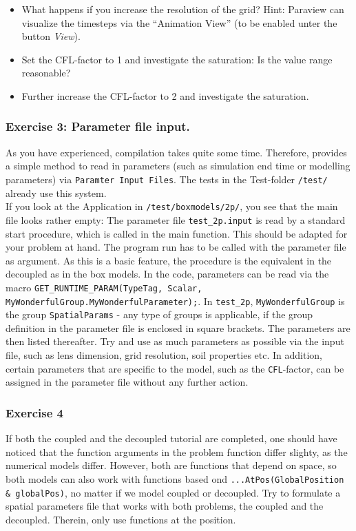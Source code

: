 \begin{itemize}
 \item What happens if you increase the resolution of the grid? Hint: Paraview can visualize the timesteps via the ``Animation View'' (to be enabled unter the button \textit{View}).
 \item Set the CFL-factor to 1 and investigate the saturation: Is the value range reasonable?
 \item Further increase the CFL-factor to 2 and investigate the saturation.
\end{itemize}

\subsubsection{Exercise 3: Parameter file input.}
As you have experienced, compilation takes quite some time. Therefore,  provides a simple method to read in parameters (such as simulation end time or modelling parameters) via \texttt{Paramter Input Files}. The tests in the Test-folder \texttt{/test/} already use this system.\\
If you look at the Application in \texttt{/test/boxmodels/2p/}, you see that the main file looks rather empty: The parameter file \texttt{test\_2p.input} is read by a standard start procedure, which is called in the main function. This should be adapted for your problem at hand. The program run has to be called with the parameter file as argument. As this is a basic \Dumux feature, the procedure is the equivalent in the decoupled as in the box models.
In the code, parameters can be read via the macro \texttt{GET\_RUNTIME\_PARAM(TypeTag, Scalar, MyWonderfulGroup.MyWonderfulParameter);}. In \texttt{test\_2p}, \texttt{MyWonderfulGroup} is the group \texttt{SpatialParams} - any type of groups is applicable, if the group definition in the parameter file is enclosed in square brackets. The parameters are then listed thereafter. Try and use as much parameters as possible via the input file, such as lens dimension, grid resolution, soil properties etc. In addition, certain parameters that are specific to the model, such as the \texttt{CFL}-factor, can be assigned in the parameter file without any further action.

\subsubsection{Exercise 4}
If both the coupled and the decoupled tutorial are completed, one should have noticed that the function arguments in the problem function differ slighty, as the numerical models differ. However, both are functions that depend on space, so both models can also work with functions based ond \mbox{\texttt{...AtPos(GlobalPosition \& globalPos)}}, no matter if we model coupled or decoupled. Try to formulate a spatial parameters file that works with both problems, the coupled and the decoupled. Therein, only use functions at the position.


